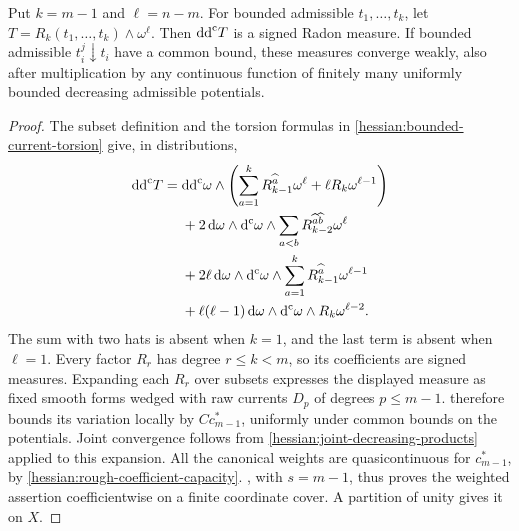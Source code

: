 \begin{lemma}\label{hessian:bounded-torsion-weight}
Put $k=m-1$ and $\ell=n-m$. For bounded admissible
$t_1,\ldots,t_k$, let
$T=R_k(t_1,\ldots,t_k)\wedge\omega^\ell$.
Then $\mathrm{dd}^{\mathrm{c}} T$ is a signed Radon measure. If bounded admissible
$t_i^j\downarrow t_i$ have a common bound, these measures converge
weakly, also after multiplication by any continuous function of
finitely many uniformly bounded decreasing admissible potentials.
\end{lemma}
\begin{proof}
The subset definition and the torsion formulas in
\cref{hessian:bounded-current-torsion} give, in distributions,
\[
\begin{aligned}
 \mathrm{dd}^{\mathrm{c}} T={}&\mathrm{dd}^{\mathrm{c}}\omega\wedge
 \left(\sum_{a=1}^kR_{k-1}^{\widehat a}\omega^\ell
                       +\ell R_k\omega^{\ell-1}\right)\\
 &+2\,\mathrm d\omega\wedge\mathrm d^{\mathrm c}\omega\wedge
       \sum_{a<b}R_{k-2}^{\widehat a\widehat b}\omega^\ell\\
 &+2\ell\,\mathrm d\omega\wedge\mathrm d^{\mathrm c}\omega\wedge
       \sum_{a=1}^kR_{k-1}^{\widehat a}\omega^{\ell-1}\\
 &+\ell(\ell-1)\,\mathrm d\omega\wedge\mathrm d^{\mathrm c}\omega\wedge
       R_k\omega^{\ell-2}.
\end{aligned}
\]
The sum with two hats is absent when $k=1$, and the last term is
absent when $\ell=1$. Every factor $R_r$ has degree $r\leq k<m$,
so its coefficients are signed measures. Expanding each $R_r$
over subsets expresses the displayed measure as fixed smooth forms
wedged with raw currents $D_p$ of degrees $p\leq m-1$.
 therefore bounds its
variation locally by $C c_{m-1}^*$, uniformly under common bounds
on the potentials. Joint convergence follows from
\cref{hessian:joint-decreasing-products} applied to this expansion.
All the canonical weights are quasicontinuous for $c_{m-1}^*$, by
\cref{hessian:rough-coefficient-capacity}.
, with $s=m-1$,
thus proves the weighted assertion coefficientwise on a finite
coordinate cover. A partition of unity gives it on $X$.
\end{proof}
